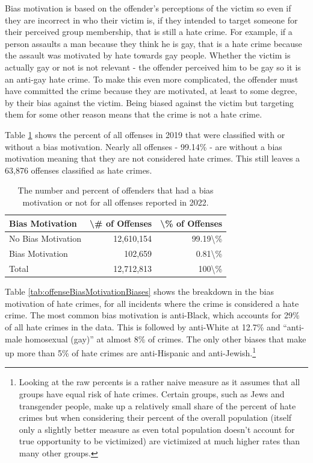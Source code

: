 \documentclass[
  12pt,
  openany]{book}
\begin{document}
Bias motivation is based on the offender's perceptions of the victim so even if they are incorrect in who their victim is, if they intended to target someone for their perceived group membership, that is still a hate crime. For example, if a person assaults a man because they think he is gay, that is a hate crime because the assault was motivated by hate towards gay people. Whether the victim is actually gay or not is not relevant - the offender perceived him to be gay so it is an anti-gay hate crime. To make this even more complicated, the offender must have committed the crime because they are motivated, at least to some degree, by their bias against the victim. Being biased against the victim but targeting them for some other reason means that the crime is not a hate crime.

Table \ref{tab:offenseBiasMotivation} shows the percent of all offenses in 2019 that were classified with or without a bias motivation. Nearly all offenses - 99.14\% - are without a bias motivation meaning that they are not considered hate crimes. This still leaves a 63,876 offenses classified as hate crimes.

\begin{longtable}[t]{lrr}
\caption{\label{tab:offenseBiasMotivation}The number and percent of offenders that had a bias motivation or not for all offenses reported in 2022.}\\
\toprule
Bias Motivation & \textbackslash{}\# of Offenses & \textbackslash{}\% of Offenses\\
\midrule
No Bias Motivation & 12,610,154 & 99.19\textbackslash{}\%\\
Bias Motivation & 102,659 & 0.81\textbackslash{}\%\\
Total & 12,712,813 & 100\textbackslash{}\%\\
\bottomrule
\end{longtable}

Table \ref{tab:offenseBiasMotivationBiases} shows the breakdown in the bias motivation of hate crimes, for all incidents where the crime is considered a hate crime. The most common bias motivation is anti-Black, which accounts for 29\% of all hate crimes in the data. This is followed by anti-White at 12.7\% and ``anti-male homosexual (gay)'' at almost 8\% of crimes. The only other biases that make up more than 5\% of hate crimes are anti-Hispanic and anti-Jewish.\footnote{Looking at the raw percents is a rather naive measure as it assumes that all groups have equal risk of hate crimes. Certain groups, such as Jews and transgender people, make up a relatively small share of the percent of hate crimes but when considering their percent of the overall population (itself only a slightly better measure as even total population doesn't account for true opportunity to be victimized) are victimized at much higher rates than many other groups.}
\end{document}

